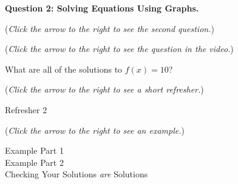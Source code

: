 \documentclass{ximera}
\begin{document}
\textbf{Question 2: Solving Equations Using Graphs.}
\begin{question}
\begin{flushright}
{\color{blue}(\emph{Click the arrow to the right to see the second question.})}
\end{flushright}
\begin{center}
\begin{expandable}
{\color{blue}(\emph{Click the arrow to the right to see the question
in the video.})}
\begin{expandable}
What are all of the solutions to $f(x)=10$?
\begin{multipleChoice}
\end{multipleChoice}
\begin{flushright}
{\color{blue}(\emph{Click the arrow to the right to see a short refresher.})}
\end{flushright}
\begin{expandable}
Refresher 2
\end{expandable}
\begin{flushright}
{\color{blue}(\emph{Click the arrow to the right to see an example.})}
\end{flushright}
\begin{expandable}
Example Part 1
\\

Example Part 2
\\

Checking Your Solutions \emph{are} Solutions
\end{expandable}
\end{expandable}
\end{expandable}
\end{center}
\end{question}
\end{document}
